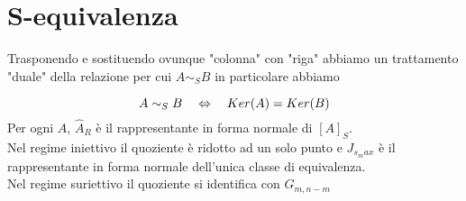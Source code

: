 \section{S-equivalenza}
Trasponendo e sostituendo ovunque "colonna" con "riga" abbiamo un trattamento "duale" della relazione per cui $A\sim_S B$ in particolare abbiamo
\begin{prop}
$$A \sim_S B \quad \Leftrightarrow \quad Ker(A)=Ker(B) $$
Per ogni $A$, $\hat{A}_R$ \`e il rappresentante in forma normale di $[A]_S$.\\
Nel regime iniettivo il quoziente \`e ridotto ad un solo punto e $J_{s_max} $ \`e il rappresentante in forma normale dell'unica classe di equivalenza.\\
Nel regime suriettivo il quoziente si identifica con $G_{m,n-m}$
\end{prop}
\newpage
